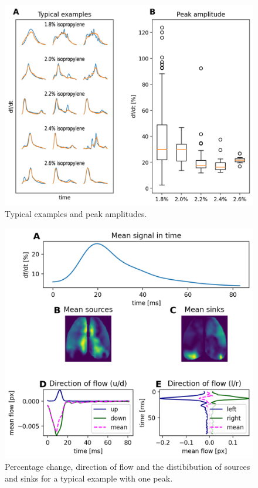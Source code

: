 \begin{figure}[!htb]
\centering
\includegraphics[width=\textwidth,height=\textheight,keepaspectratio]{Figures/typical_examples_and_peak_amplitudes}
\decoRule
\caption[Typical examples and peak amplitudes]{Typical examples and peak amplitudes.}
\label{fig:typical_examples_and_peak_amplitudes}
\end{figure}

\begin{figure}[!htb]
\centering
\includegraphics[width=\textwidth,height=\textheight,keepaspectratio]{Figures/percentage_change_direction_of_flow_and_sources_sinks}
\decoRule
\caption[Percentage change, direction of flow and the distibibution of sources and sinks for a typical example]{Percentage change, direction of flow and the distibibution of sources and sinks for a typical example with one peak.}
\label{fig:percentage_change_direction_of_flow_and_sources_sinks}
\end{figure}


